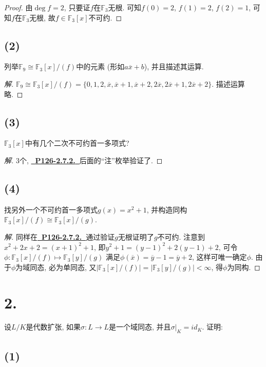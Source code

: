 \documentclass[12pt, a4paper, fontset=windows]{ctexart}
\newcommand{\F}{\mathbb{F}}
\newcommand{\abs}[1]{\left|{#1}\right|}
\newcommand{\cl}[1]{\overline{#1}} %
\newcommand{\isom}{\cong} %
\newcommand{\myref}[2][]{\hyperref[#1]{\bf\color{blue}\ {#2}\ }}
\newcommand{\yh}[1]{“{#1}”} %
\newenvironment{solution}{\begin{proof}[解]}{\end{proof}}
\begin{document}
\begin{proof}
由$\deg f=2$, 只要证$f$在$\F_3$无根. 
可知$f(0)=2$, $f(1)=2$, $f(2)=1$, 可知$f$在$\F_3$无根, 
故$f\in\F_3[x]$不可约. 
\end{proof}

\subsection*{(2)}

列举$\F_9\isom\F_3[x]/(f)$中的元素 
(形如$a\cl{x}+b$), 并且描述其运算. 

\begin{solution}
$\F_9\isom\F_3[x]/(f)=\{0,1,2,\cl{x},\cl{x}+1,\cl{x}+2,
2\cl{x},2\cl{x}+1,2\cl{x}+2\}$. 描述运算略. 
\end{solution}

\subsection*{(3)}

$\F_3[x]$中有几个二次不可约首一多项式? 

\begin{solution}
$3$个, \myref[enum-irr]{P126-2.7.2.}后面的\yh{注}枚举验证了. 
\end{solution}

\subsection*{(4)}

找另外一个不可约首一多项式$g(x)=x^2+1$, 
并构造同构$\F_3[x]/(f)\isom\F_3[x]/(g)$. 

\begin{solution}
同样在\myref[enum-irr]{P126-2.7.2.}通过验证$g$无根证明了$g$不可约. 
注意到$x^2+2x+2=(x+1)^2+1$, 即$y^2+1=(y-1)^2+2(y-1)+2$, 
可令$\phi:\F_3[x]/(f)\mapsto\F_3[y]/(g)$
满足$\phi(\cl{x})=\cl{y}-1=\cl{y}+2$, 这样可唯一确定$\phi$. 
由于$\phi$为域同态, 必为单同态, 又$\abs{\F_3[x]/(f)}=\abs{\F_3[y]/(g)}<\infty$, 
得$\phi$为同构. 
\end{solution}

\section*{2.}

设$L/K$是代数扩张, 如果$\sigma:L\to L$是一个域同态, 
并且$\sigma|_K=id_K$. 证明: 

\subsection*{(1)}
\end{document}
